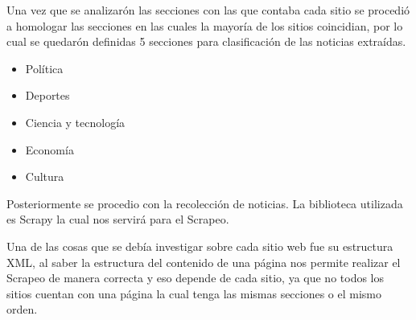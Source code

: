 Una vez que se analizarón las secciones con las que contaba cada sitio se procedió a homologar las secciones en las cuales la mayoría de los 
sitios coincidian, por lo cual se quedarón definidas 5 secciones para clasificación de las noticias extraídas.

\begin{itemize}
    \item Política
    \item Deportes
    \item Ciencia y tecnología
    \item Economía
    \item Cultura
\end{itemize}

Posteriormente se procedio con la recolección de noticias. 
La biblioteca utilizada es Scrapy la cual nos servirá para el Scrapeo.

Una de las cosas que se debía investigar sobre cada sitio web fue su estructura XML, al saber la estructura del contenido de una página  
nos permite realizar el Scrapeo de manera correcta y eso depende de cada sitio, ya que no todos los sitios cuentan con una página la cual tenga 
las mismas secciones o el mismo orden.
\\

